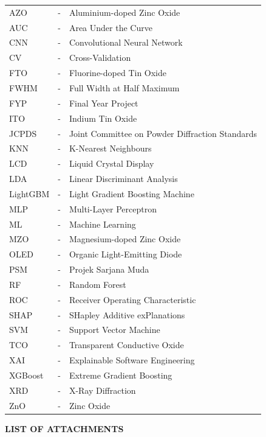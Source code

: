 \documentclass[12pt, oneside]{article} %
\begin{document}
\noindent
\begin{tabular}{>{\raggedright\arraybackslash}p{2.5cm} >{\centering\arraybackslash}m{0.5cm} >{\raggedright\arraybackslash}p{11.0cm}}
AZO   & - & Aluminium-doped Zinc Oxide \\
AUC   & - & Area Under the Curve \\
CNN   & - & Convolutional Neural Network \\
CV    & - & Cross-Validation \\
FTO   & - & Fluorine-doped Tin Oxide \\
FWHM  & - & Full Width at Half Maximum \\
FYP   & - & Final Year Project \\
ITO   & - & Indium Tin Oxide \\
JCPDS & - & Joint Committee on Powder Diffraction Standards \\
KNN   & - & K-Nearest Neighbours \\
LCD   & - & Liquid Crystal Display \\
LDA   & - & Linear Discriminant Analysis \\
LightGBM & - & Light Gradient Boosting Machine \\
MLP   & - & Multi-Layer Perceptron \\
ML    & - & Machine Learning \\
MZO   & - & Magnesium-doped Zinc Oxide \\
OLED  & - & Organic Light-Emitting Diode \\
PSM   & - & Projek Sarjana Muda \\
RF    & - & Random Forest \\
ROC   & - & Receiver Operating Characteristic \\
SHAP  & - & SHapley Additive exPlanations \\
SVM   & - & Support Vector Machine \\
TCO   & - & Transparent Conductive Oxide \\
XAI   & - & Explainable Software Engineering \\
XGBoost & - & Extreme Gradient Boosting \\
XRD   & - & X-Ray Diffraction \\
ZnO   & - & Zinc Oxide \\
\end{tabular}



\vfill \null
\newpage



\vfill \null
{}
{}
\begin{center}
\textbf{LIST OF ATTACHMENTS}
\end{center}
\vspace{2cm}
\end{document}
